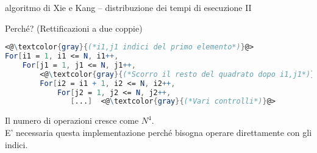 \documentclass[10pt]{beamer}
\begin{document}

\begin{frame}[fragile]{algoritmo di Xie e Kang -- distribuzione dei tempi di esecuzione II}
	
Perché? (Rettificazioni a due coppie)
\begin{lstlisting}[language=Mathematica,basicstyle=\ttfamily,keywordstyle=\color{blue}]
<@\textcolor{gray}{(*i1,j1 indici del primo elemento*)}@>
For[i1 = 1, i1 <= N, i1++,  
    For[j1 = 1, j1 <= N, j1++, 
        <@\textcolor{gray}{(*Scorro il resto del quadrato dopo i1,j1*)}@>
        For[i2 = i1 + 1, i2 <= N, i2++, 
            For[j2 = 1, j2 <= N, j2++, 
               [...]  <@\textcolor{gray}{(*Vari controlli*)}@>
\end{lstlisting}
Il numero di operazioni cresce come $ N^4 $. \\
E' necessaria questa implementazione perché bisogna operare direttamente con gli indici.
\end{frame}
\end{document}
